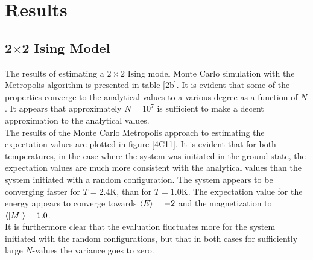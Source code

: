 \documentclass[%
reprint,nofootinbib,
amsmath,amssymb,
aps,
]{revtex4-1}
\begin{document}
\newpage 
\onecolumngrid
\section{Results} 
\twocolumngrid
\vspace{4mm}

\subsection*{2$\times$2 Ising Model} \noindent 
The results of estimating a $2\times 2$ Ising model Monte Carlo simulation with the Metropolis algorithm is presented in table \ref{2b}. It is evident that some of the properties converge to the analytical values to a various degree as a function of $N$. It appears that approximately $N=10^7$ is sufficient to make a decent approximation to the analytical values. \\ \indent 
The results of the Monte Carlo Metropolis approach to estimating the expectation values are plotted in figure \ref{4C11}. It is evident that for both temperatures, in the case where the system was initiated in the ground state, the expectation values are much more consistent with the analytical values than the system initiated with a random configuration. The system appears to be converging faster for $T = 2.4$K, than for $T = 1.0$K. The expectation value for the energy appears to converge towards $\expval{E} = -2$ and the magnetization to $\expval{\abs{M}} = 1.0$.\\ \noindent 
It is furthermore clear that the evaluation fluctuates more for the system initiated with the random configurations, but that in both cases for sufficiently large $N$-values the variance goes to zero. 
\vspace{2mm}
\end{document}
